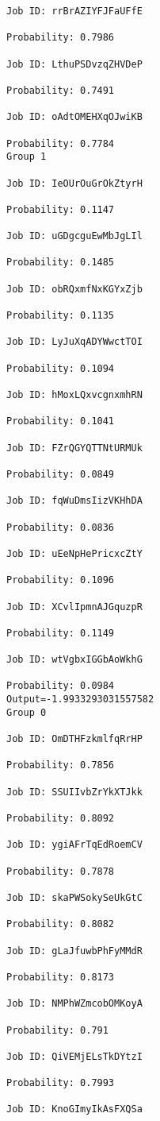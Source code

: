 \documentclass[11pt]{article}
\begin{document}
\begin{Verbatim}[commandchars=\\\{\}]
Job ID: rrBrAZIYFJFaUFfE

Probability: 0.7986

Job ID: LthuPSDvzqZHVDeP

Probability: 0.7491

Job ID: oAdtOMEHXqOJwiKB

Probability: 0.7784
Group 1

Job ID: IeOUrOuGrOkZtyrH

Probability: 0.1147

Job ID: uGDgcguEwMbJgLIl

Probability: 0.1485

Job ID: obRQxmfNxKGYxZjb

Probability: 0.1135

Job ID: LyJuXqADYWwctTOI

Probability: 0.1094

Job ID: hMoxLQxvcgnxmhRN

Probability: 0.1041

Job ID: FZrQGYQTTNtURMUk

Probability: 0.0849

Job ID: fqWuDmsIizVKHhDA

Probability: 0.0836

Job ID: uEeNpHePricxcZtY

Probability: 0.1096

Job ID: XCvlIpmnAJGquzpR

Probability: 0.1149

Job ID: wtVgbxIGGbAoWkhG

Probability: 0.0984
Output=-1.9933293031557582
Group 0

Job ID: OmDTHFzkmlfqRrHP

Probability: 0.7856

Job ID: SSUIIvbZrYkXTJkk

Probability: 0.8092

Job ID: ygiAFrTqEdRoemCV

Probability: 0.7878

Job ID: skaPWSokySeUkGtC

Probability: 0.8082

Job ID: gLaJfuwbPhFyMMdR

Probability: 0.8173

Job ID: NMPhWZmcobOMKoyA

Probability: 0.791

Job ID: QiVEMjELsTkDYtzI

Probability: 0.7993

Job ID: KnoGImyIkAsFXQSa


\end{Verbatim}
\end{document}
